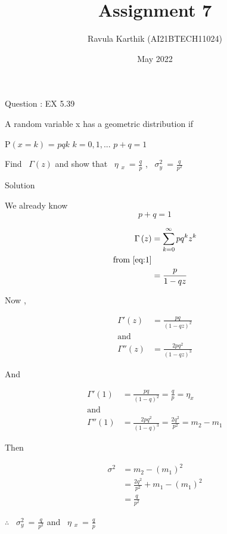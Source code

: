 \documentclass[journal,12pt,twocolumn]{beamer}
\title{Assignment 7}
\author{Ravula Karthik (AI21BTECH11024)}
\date {May 2022}
\providecommand{\brak}[1]{\ensuremath{\left(#1\right)}}
\begin{document}
	\begin{frame}
		\titlepage 
	\end{frame}
	
	\begin{frame}{Question : EX 5.39}
		
		A random variable x has a geometric distribution if
		
	\centerline{P\brak{x=k} = $ pqk$ $k = 0,1,...$ $ p + q = 1 $ }
	
Find {\ $\Gamma $\brak{z} } and show that \ $ \eta$ $_x$\  = $\frac{q}{p}$ , \ $\sigma$$_y ^2$\  = $\frac{q}{p^2}$
		
	\end{frame}
	\begin{frame}{Solution}
		  
		We already know
		\begin{equation}
			\label{eq:1}
			p + q = 1
		\end{equation}
		
		\begin{align}
			\Gamma\brak{z}  &= \sum_{k = 0}^{\infty} pq^kz^k\\
			\text{from \eqref{eq:1}}     \nonumber\\
			&= \frac{p}{1-qz}
		\end{align} 
	\end{frame}
	
	\begin{frame}
		
	Now ,
	
	\begin{align}
		\Gamma'\brak{z}  &= \frac{pq}{(1-qz)^2}\\
		\text{and}                  \nonumber\\
		\Gamma''\brak{z}  &= \frac{2pq^2}{(1-qz)^3}
	\end{align} 
	
	And 
	
	\begin{align}
		\Gamma'\brak{1}  &= \frac{pq}{(1-q)^2} = \frac{q}{p} =  \eta _x\  \\
		\text{and}                  \nonumber\\
		\Gamma''\brak{1}  &= \frac{2pq^2}{(1-q)^3} = \frac{2q^2}{p^2} = m_2 - m_1
	\end{align} 

	\end{frame}
	
	
	\begin{frame}
	Then 
	
	\begin{align}
		\sigma^2  &= m_2 - (m_1)^2 \\
		&= \frac{2q^2}{p^2} + m_1 - (m_1)^2  \\
		&= \frac{q}{p^2}
	\end{align} 
	
	$\therefore$  \ $\sigma$$_y ^2$\  = $\frac{q}{p^2}$ and \ $ \eta$ $_x$\ = $\frac{q}{p}$ 
	\end{frame}
	
	
\end{document}
